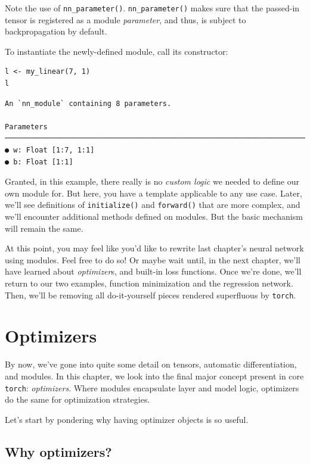 \documentclass[
  letterpaper,
]{krantz}
\begin{document}
Note the use of \texttt{nn\_parameter()}. \texttt{nn\_parameter()} makes
sure that the passed-in tensor is registered as a module
\emph{parameter}, and thus, is subject to backpropagation by default.

To instantiate the newly-defined module, call its constructor:

\begin{verbatim}
l <- my_linear(7, 1)
l
\end{verbatim}

\begin{verbatim}
An `nn_module` containing 8 parameters.

Parameters ────────────────────────────────────────────────────────────────────────────────────────────
● w: Float [1:7, 1:1]
● b: Float [1:1]
\end{verbatim}

Granted, in this example, there really is no \emph{custom logic} we
needed to define our own module for. But here, you have a template
applicable to any use case. Later, we'll see definitions of
\texttt{initialize()} and \texttt{forward()} that are more complex, and
we'll encounter additional methods defined on modules. But the basic
mechanism will remain the same.

At this point, you may feel like you'd like to rewrite last chapter's
neural network using modules. Feel free to do so! Or maybe wait until,
in the next chapter, we'll have learned about \emph{optimizer}s, and
built-in loss functions. Once we're done, we'll return to our two
examples, function minimization and the regression network. Then, we'll
be removing all do-it-yourself pieces rendered superfluous by
\texttt{torch}.

\hypertarget{sec:optimizers}{%
\chapter{Optimizers}\label{sec:optimizers}}

By now, we've gone into quite some detail on tensors, automatic
differentiation, and modules. In this chapter, we look into the final
major concept present in core \texttt{torch}:
\emph{optimizers}. Where modules encapsulate layer and
model logic, optimizers do the same for optimization strategies.

Let's start by pondering why having optimizer objects is so useful.

\hypertarget{why-optimizers}{%
\section{Why optimizers?}\label{why-optimizers}}
\end{document}
